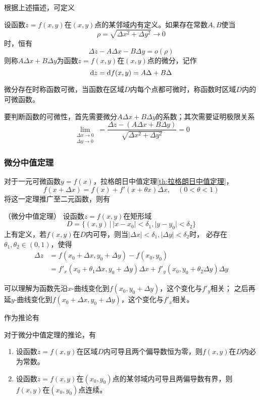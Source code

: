 根据上述描述，可定义
\begin{definition}
    设函数$z=f(x,y)$在$(x,y)$点的某邻域内有定义。如果存在常数$A,B$使当
    \[ \rho = \sqrt{\Delta x^2 + \Delta y^2} \to 0 \]
    时，恒有
    \[ \Delta z - A\Delta x - B\Delta y = o(\rho) \]
    则称$A\Delta x + B\Delta y$为函数$z=f(x,y)$在$(x,y)$点的微分，记作
    \[ \mathop{}\!\mathrm{d} z = \mathop{}\!\mathrm{d} f(x,y) = A\Delta + B\Delta \]
\end{definition}
微分存在时称函数可微，当函数在区域$D$内每个点都可微时，称函数时区域$D$内的可微函数。

要判断函数的可微性，首先需要微分$A\Delta x+ B\Delta y$的系数；其次需要证明极限关系
\begin{equation}
    \lim_{\substack{\Delta x\to 0\\ \Delta y \to 0}}
    = \frac{\Delta z - (A\Delta x + B\Delta y)}{\sqrt{\Delta x^2 + \Delta y^2}}
    =0
\end{equation}

\subsubsection{微分中值定理}
对于一元可微函数$y=f(x)$，拉格朗日中值定理\ref{th:拉格朗日中值定理}，
\[ f(x+\Delta x) = f(x) + f'(x+\theta x)\Delta x,\quad (0<\theta<1) \]
将这一定理推广至二元函数，则有
\begin{theorem}
    （微分中值定理）
    \label{th:微分中值定理}
    设函数$z=f(x,y)$在矩形域
    \[ D = \{(x,y)\,|\,|x-x_0|<\delta_1, |y-y_0| < \delta_2 \} \]
    上有定义，若$f(x,y)$在$D$内可导，则当$|\Delta x|<\delta_1, |\Delta y|<\delta_2$时，
    必存在$\theta_1,\theta_2\in(0,1)$，使得
    \begin{align*}
        \Delta z & = f(x_0+\Delta x, y_0 +\Delta y) - f(x_0,y_0)                                                 \\
                 & =f'_x(x_0+\theta_1\Delta x, y_0 + \Delta y) \Delta x + f'_y(x_0,y_0+\theta_2\Delta y)\Delta y
    \end{align*}
\end{theorem}
可以理解为函数先沿$x$-曲线变化到$f(x_0,y_0+\Delta y)$，这个变化与$f'_y$相关；
之后再延$y$-曲线变化到$f(x_0+\Delta x, y_0+\Delta y)$，这个变化与$f'_x$相关。

作为推论有
\begin{theorem}
    对于微分中值定理的推论，有
    \begin{enumerate}[(1)]
        \item 设函数$z=f(x,y)$在区域$D$内可导且两个偏导数恒为零，则$f(x,y)$在$D$内必为常数。
        \item 设函数$z=f(x,y)$在$(x_0,y_0)$点的某邻域内可导且两偏导数有界，则$f(x,y)$在$(x_0,y_0)$点连续。
    \end{enumerate}
\end{theorem}

